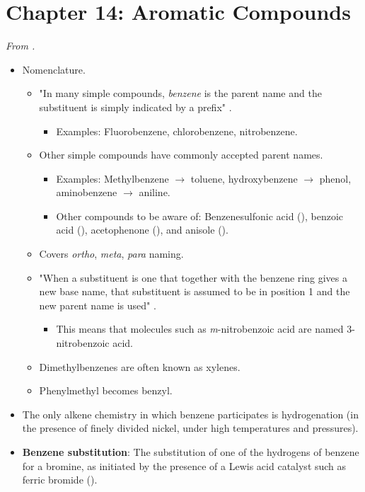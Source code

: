 \documentclass[../notes.tex]{subfiles}
\begin{document}
\section{Chapter 14: Aromatic Compounds}
\emph{From \textcite{bib:SolomonsEtAl}.}
\begin{itemize}
    \item {}Nomenclature.
    \begin{itemize}
        \item "In many simple compounds, \emph{benzene} is the parent name and the substituent is simply indicated by a prefix" \parencite[619]{bib:SolomonsEtAl}.
        \begin{itemize}
            \item Examples: Fluorobenzene, chlorobenzene, nitrobenzene.
        \end{itemize}
        \item Other simple compounds have commonly accepted parent names.
        \begin{itemize}
            \item Examples: Methylbenzene $\to$ toluene, hydroxybenzene $\to$ phenol, aminobenzene $\to$ aniline.
            \item Other compounds to be aware of: Benzenesulfonic acid (), benzoic acid (), acetophenone (), and anisole ().
        \end{itemize}
        \item Covers \emph{ortho}, \emph{meta}, \emph{para} naming.
        \item "When a substituent is one that together with the benzene ring gives a new base name, that substituent is assumed to be in position 1 and the new parent name is used" \parencite[620]{bib:SolomonsEtAl}.
        \begin{itemize}
            \item This means that molecules such as \emph{m}-nitrobenzoic acid are named 3-nitrobenzoic acid.
        \end{itemize}
        \item Dimethylbenzenes are often known as xylenes.
        \item Phenylmethyl becomes benzyl.
    \end{itemize}
    \item The only alkene chemistry in which benzene participates is hydrogenation (in the presence of finely divided nickel, under high temperatures and pressures).
    \item \textbf{Benzene substitution}: The substitution of one of the hydrogens of benzene for a bromine, as initiated by the presence of a Lewis acid catalyst such as ferric bromide ().

\end{itemize}
\end{document}
